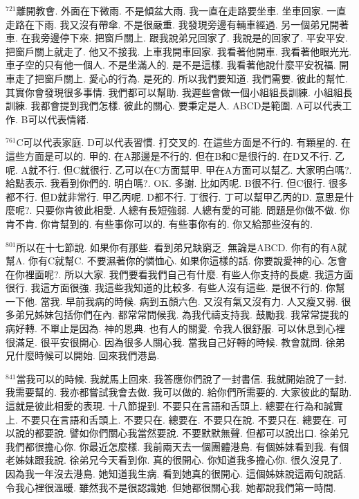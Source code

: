 \documentclass{book}
\begin{document}
$^{721}$離開教會.
外面在下微雨.
不是傾盆大雨.
我一直在走路要坐車.
坐車回家.
一直走路在下雨.
我又沒有帶傘.
不是很嚴重.
我發現旁邊有輛車經過.
另一個弟兄開著車.
在我旁邊停下來.
把窗戶關上.
跟我說弟兄回家了.
我說是的回家了.
平安平安.
把窗戶關上就走了.
他又不接我.
上車我開車回家.
我看著他開車.
我看著他眼光光.
車子空的只有他一個人.
不是坐滿人的.
是不是這樣.
我看著他說什麼平安祝福.
開車走了把窗戶關上.
愛心的行為.
是死的.
所以我們要知道.
我們需要.
彼此的幫忙.
其實你會發現很多事情.
我們都可以幫助.
我遲些會做一個小組組長訓練.
小組組長訓練.
我都會提到我們怎樣.
彼此的關心.
要秉定是人.
ABCD是範圍.
A可以代表工作.
B可以代表情緒.

$^{761}$C可以代表家庭.
D可以代表習慣.
打交叉的.
在這些方面是不行的.
有顆星的.
在這些方面是可以的.
甲的.
在A那邊是不行的.
但在B和C是很行的.
在D又不行.
乙呢.
A就不行.
但C就很行.
乙可以在C方面幫甲.
甲在A方面可以幫乙.
大家明白嗎?.
給點表示.
我看到你們的.
明白嗎?.
OK.
多謝.
比如丙呢.
B很不行.
但C很行.
很多都不行.
但D就非常行.
甲乙丙呢.
D都不行.
丁很行.
丁可以幫甲乙丙的D.
意思是什麼呢?.
只要你肯彼此相愛.
人總有長短強弱.
人總有愛的可能.
問題是你做不做.
你肯不肯.
你肯幫到的.
有些事你可以的.
有些事你有的.
你又給那些沒有的.

$^{801}$所以在十七節說.
如果你有那些.
看到弟兄缺窮乏.
無論是ABCD.
你有的有A就幫A.
你有C就幫C.
不要濕著你的憐恤心.
如果你這樣的話.
你要說愛神的心.
怎會在你裡面呢?.
所以大家.
我們要看我們自己有什麼.
有些人你支持的長處.
我這方面很行.
我這方面很強.
我這些我知道的比較多.
有些人沒有這些.
是很不行的.
你幫一下他.
當我.
早前我病的時候.
病到五顏六色.
又沒有氣又沒有力.
人又瘦又弱.
很多弟兄姊妹包括你們在內.
都常常問候我.
為我代禱支持我.
鼓勵我.
我常常提我的病好轉.
不單止是因為.
神的恩典.
也有人的關愛.
令我人很舒服.
可以休息到心裡很滿足.
很平安很開心.
因為很多人關心我.
當我自己好轉的時候.
教會就問.
徐弟兄什麼時候可以開始.
回來我們港島.

$^{841}$當我可以的時候.
我就馬上回來.
我答應你們說了一封書信.
我就開始說了一封.
我需要幫的.
我亦都嘗試我會去做.
我可以做的.
給你們所需要的.
大家彼此的幫助.
這就是彼此相愛的表現.
十八節提到.
不要只在言語和舌頭上.
總要在行為和誠實上.
不要只在言語和舌頭上.
不要只在.
總要在.
不要只在說.
不要只在.
總要在.
可以說的都要說.
譬如你們關心我當然要說.
不要默默無聲.
但都可以說出口.
徐弟兄我們都很擔心你.
你最近怎麼樣.
我前兩天去一個團體港島.
有個姊妹看到我.
有個老姊妹跟我說.
徐弟兄今天看到你.
真的很開心.
你知道我多擔心你.
很久沒見了.
因為我一年沒去港島.
她知道我生病.
看到她真的很開心.
這個姊妹說這兩句說話.
令我心裡很溫暖.
雖然我不是很認識她.
但她都很關心我.
她都說我們第一時間.
\end{document}
